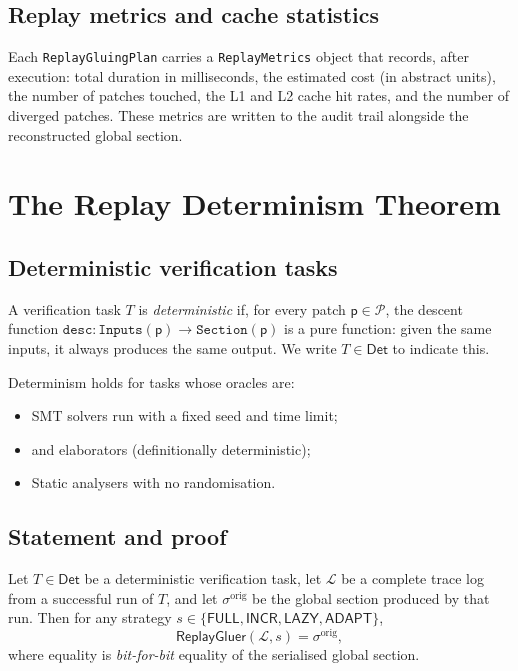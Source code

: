 \documentclass[11pt]{article}
\newcommand{\Gluer}{\mathsf{ReplayGluer}}
\newcommand{\TraceLog}{\mathcal{L}}
\newcommand{\Patch}{\mathsf{p}}
\newcommand{\PatchSet}{\mathcal{P}}
\newcommand{\GS}{\sigma}                   %
\newcommand{\DetProg}{\mathsf{Det}}
\newcommand{\StratFull}{\mathsf{FULL}}
\newcommand{\StratInc}{\mathsf{INCR}}
\newcommand{\StratLazy}{\mathsf{LAZY}}
\newcommand{\StratAdapt}{\mathsf{ADAPT}}
\begin{document}
\subsection{Replay metrics and cache statistics}

Each \texttt{ReplayGluingPlan} carries a \texttt{ReplayMetrics}
object that records, after execution: total duration in milliseconds,
the estimated cost (in abstract units), the number of patches touched,
the L1 and L2 cache hit rates, and the number of diverged patches.
These metrics are written to the audit trail alongside the reconstructed
global section.


\section{The Replay Determinism Theorem}
\label{sec:theorem}

\subsection{Deterministic verification tasks}

\begin{definition}
\label{def:det-task}
A verification task $T$ is \emph{deterministic} if, for every patch
$\Patch \in \PatchSet$, the descent function
$\mathtt{desc}\colon \mathtt{Inputs}(\Patch) \to \mathtt{Section}(\Patch)$
is a pure function: given the same inputs, it always produces the same
output.  We write $T \in \DetProg$ to indicate this.
\end{definition}

Determinism holds for tasks whose oracles are:
\begin{itemize}
\item SMT solvers run with a fixed seed and time limit;
\item \LEAN{} and \Coq{} elaborators (definitionally deterministic);
\item Static analysers with no randomisation.
\end{itemize}

\subsection{Statement and proof}

\begin{theorem}
\label{thm:replay-det}
Let $T \in \DetProg$ be a deterministic verification task, let
$\TraceLog$ be a complete trace log from a successful run of $T$, and
let $\GS^{\mathrm{orig}}$ be the global section produced by that run.
Then for any strategy $s \in \{\StratFull, \StratInc, \StratLazy,
\StratAdapt\}$,
\[
  \Gluer(\TraceLog, s) = \GS^{\mathrm{orig}},
\]
where equality is \emph{bit-for-bit} equality of the serialised global
section.
\end{theorem}
\end{document}
